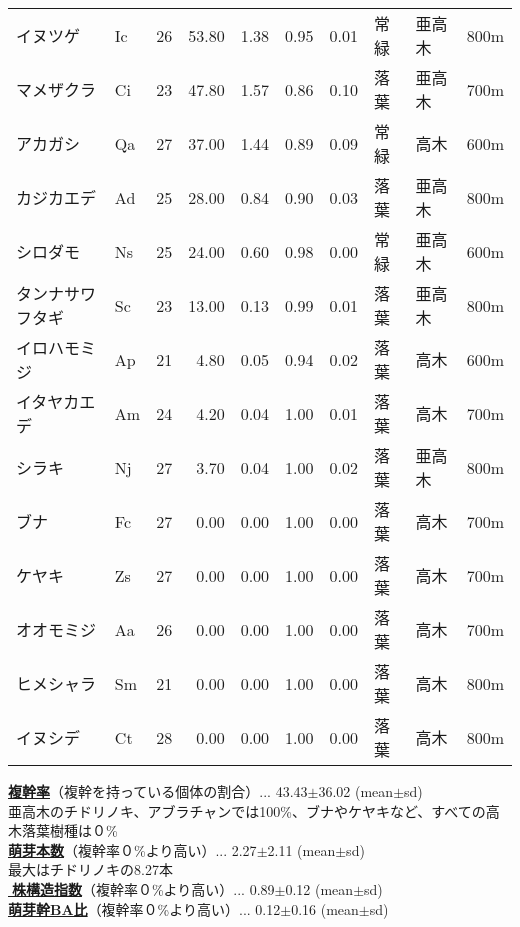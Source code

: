 \documentclass[a0, 30pt, plainboxedsections]{sciposter} %
\begin{document}
\begin{multicols}{2}
\begin{wraptable}{r}{14.5em}
{\begin{tabular}{llrrrrrlll}
イヌツゲ & Ic &  26 & 53.80 & 1.38 & 0.95 & 0.01 & 常緑 & 亜高木 & 800m \\ 
マメザクラ & Ci &  23 & 47.80 & 1.57 & 0.86 & 0.10 & 落葉 & 亜高木 & 700m \\ 
アカガシ & Qa &  27 & 37.00 & 1.44 & 0.89 & 0.09 & 常緑 & 高木 & 600m \\ 
カジカエデ & Ad &  25 & 28.00 & 0.84 & 0.90 & 0.03 & 落葉 & 亜高木 & 800m \\ 
シロダモ & Ns &  25 & 24.00 & 0.60 & 0.98 & 0.00 & 常緑 & 亜高木 & 600m \\ 
タンナサワフタギ & Sc &  23 & 13.00 & 0.13 & 0.99 & 0.01 & 落葉 & 亜高木 & 800m \\ 
イロハモミジ & Ap &  21 & 4.80 & 0.05 & 0.94 & 0.02 & 落葉 & 高木 & 600m \\ 
イタヤカエデ & Am &  24 & 4.20 & 0.04 & 1.00 & 0.01 & 落葉 & 高木 & 700m \\ 
シラキ & Nj &  27 & 3.70 & 0.04 & 1.00 & 0.02 & 落葉 & 亜高木 & 800m \\ 
\rowcolor{Blue2!30}ブナ & Fc &  27 & 0.00 & 0.00 & 1.00 & 0.00 & 落葉 & 高木 & 700m \\ 
\rowcolor{Blue2!30}ケヤキ & Zs &  27 & 0.00 & 0.00 & 1.00 & 0.00 & 落葉 & 高木 & 700m \\ 
\rowcolor{Blue2!30}オオモミジ & Aa &  26 & 0.00 & 0.00 & 1.00 & 0.00 & 落葉 & 高木 & 700m \\ 
\rowcolor{Blue2!30}ヒメシャラ & Sm &  21 & 0.00 & 0.00 & 1.00 & 0.00 & 落葉 & 高木 & 800m \\ 
\rowcolor{Blue2!30}イヌシデ & Ct &  28 & 0.00 & 0.00 & 1.00 & 0.00 & 落葉 & 高木 & 800m \\ 
   \hline
\end{tabular}}
\end{wraptable}

\textbf{\underline{複幹率}}{\footnotesize（複幹を持っている個体の割合）}... 43.43$\pm$36.02 (mean$\pm$sd)\\
{\scriptsize 亜高木のチドリノキ、アブラチャンでは100\%、ブナやケヤキなど、すべての高木落葉樹種は０\%}\\
\textbf{\underline{萌芽本数}}{\footnotesize（複幹率０\%より高い）}... 2.27$\pm$2.11 (mean$\pm$sd)\\
{\scriptsize 最大はチドリノキの8.27本}\\
\textbf{\underline{株構造指数}}{\footnotesize（複幹率０\%より高い）}... 0.89$\pm$0.12 (mean$\pm$sd)\\
\textbf{\underline{萌芽幹BA比}}{\footnotesize（複幹率０\%より高い）}... 0.12$\pm$0.16 (mean$\pm$sd)


\end{multicols}
\end{document}
